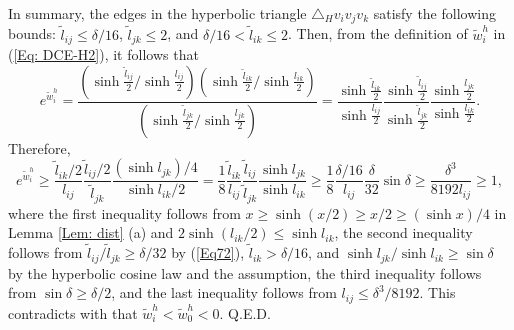 \documentclass[12pt]{amsart}
\theoremstyle{definition}
\newtheorem{remark}[theorem]{Remark}
\def\qed{\hfill{Q.E.D.}\smallskip}
\begin{document}
In summary, the edges in the hyperbolic triangle $\triangle_H v_iv_jv_k$ satisfy the following bounds: 
$\tilde l_{ij}\leq \delta/16$, $\tilde l_{jk}\leq 2$, and $\delta/16< \tilde l_{ik}\leq 2$.
Then, from the definition of $\tilde w^h_i$ in (\ref{Eq: DCE-H2}), it follows that
\begin{equation*}
e^{\tilde w^h_i}
=\frac{(\sinh \frac{\tilde l_{ij}}{2}/\sinh \frac{l_{ij}}{2})(\sinh \frac{\tilde l_{ik}}{2}/\sinh \frac{l_{ik}}{2})}{(\sinh \frac{\tilde l_{jk}}{2}/\sinh \frac{l_{jk}}{2})}
=\frac{\sinh \frac{\tilde l_{ik}}{2}}{\sinh \frac{l_{ij}}{2}}\frac{\sinh\frac{\tilde l_{ij}}{2}}{\sinh \frac{\tilde l_{jk}}{2}}\frac{\sinh\frac{l_{jk}}{2}}{\sinh \frac{ l_{ik}}{2}}.
\end{equation*}
Therefore,
\begin{equation*}
e^{\tilde w^h_i}
\geq \frac{\tilde l_{ik}/2}{l_{ij}}\frac{\tilde l_{ij}/2}{\tilde l_{jk}}\frac{(\sinh l_{jk})/4}{\sinh l_{ik}/2}
=\frac{1}{8}\frac{\tilde l_{ik}}{l_{ij}}\frac{\tilde l_{ij}}{\tilde l_{jk}}\frac{\sinh l_{jk}}{\sinh l_{ik}}
\geq\frac{1}{8}\frac{\delta/16}{l_{ij}}\frac{\delta}{32}\sin\delta
\geq \frac{\delta^3}{8192l_{ij}}
\geq 1,
\end{equation*}
where the first inequality follows from $x\geq\sinh (x/2)\geq x/2\geq (\sinh x)/4$ in Lemma \ref{Lem: dist} (a) and $2\sinh (l_{ik}/2)\leq \sinh l_{ik}$,
the second inequality follows from $\tilde l_{ij}/\tilde l_{jk}\geq \delta/32$ by (\ref{Eq72}), $\tilde l_{ik}> \delta/16$, and $\sinh l_{jk}/\sinh l_{ik}\geq \sin\delta$ by the hyperbolic cosine law and the assumption,
the third inequality follows from $\sin \delta \geq \delta/2$,
and the last inequality follows from $l_{ij}\leq \delta^3/8192$.
This contradicts with that $\tilde w^h_i<\tilde w^h_0<0$.
\qed

\end{document}
